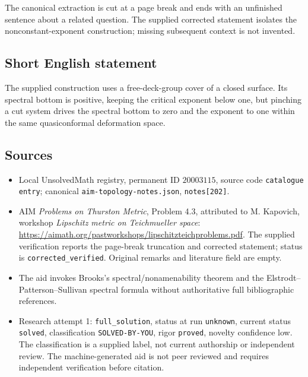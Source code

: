 \documentclass[11pt]{article}
\begin{document}
The canonical extraction is cut at a page break and ends with an unfinished sentence about a related question. The supplied corrected statement isolates the nonconstant-exponent construction; missing subsequent context is not invented.
\subsection{Short English statement}
The supplied construction uses a free-deck-group cover of a closed surface. Its spectral bottom is positive, keeping the critical exponent below one, but pinching a cut system drives the spectral bottom to zero and the exponent to one within the same quasiconformal deformation space.
\subsection{Sources}
\begin{itemize}
\item Local UnsolvedMath registry, permanent ID $20003115$, source code \texttt{catalogue entry}; canonical \texttt{aim-topology-notes.json}, \texttt{notes[202]}.
\item AIM \emph{Problems on Thurston Metric}, Problem 4.3, attributed to M. Kapovich, workshop \emph{Lipschitz metric on Teichmueller space}: \url{https://aimath.org/pastworkshops/lipschitzteichproblems.pdf}. The supplied verification reports the page-break truncation and corrected statement; status is \texttt{corrected\_verified}. Original remarks and literature field are empty.
\item The aid invokes Brooks's spectral/nonamenability theorem and the Elstrodt--Patterson--Sullivan spectral formula without authoritative full bibliographic references.
\item Research attempt 1: \texttt{full\_solution}, status at run \texttt{unknown}, current status \texttt{solved}, classification \texttt{SOLVED-BY-YOU}, rigor \texttt{proved}, novelty confidence low. The classification is a supplied label, not current authorship or independent review. The machine-generated aid is not peer reviewed and requires independent verification before citation.
\end{itemize}
\end{document}
